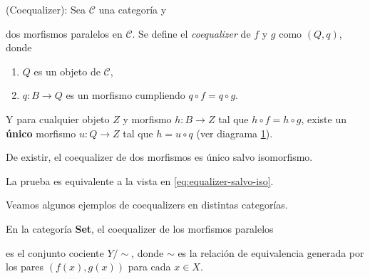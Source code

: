 \begin{definicion}
    (Coequalizer): Sea $\mathscr{C}$ una categoría y  dos morfismos paralelos en $\mathscr{C}$. Se define el \textit{coequalizer} de $f$ y $g$ como $(Q, q)$, donde
    \begin{enumerate}
        \item $Q$ es un objeto de $\mathscr{C}$,
        \item $q: B \longrightarrow Q$ es un morfismo cumpliendo $q \circ f = q \circ g$.
    \end{enumerate}
    Y para cualquier objeto $Z$ y morfismo $h: B \longrightarrow Z$ tal que $h \circ f = h \circ g$, existe un \textbf{único} morfismo $u: Q \longrightarrow Z$ tal que $h = u \circ q$ (ver diagrama \ref{diagrama:coequalizer}).

    \begin{figure}[h!]
        \centering
        \label{diagrama:coequalizer}
    \end{figure}

\end{definicion}

\begin{proposicion} \label{coeq:coequalizer}
    De existir, el coequalizer de dos morfismos es único salvo isomorfismo.
\end{proposicion}

La prueba es equivalente a la vista en \ref{eq:equalizer-salvo-iso}.

Veamos algunos ejemplos de coequalizers en distintas categorías.

\begin{ejemplo}
    En la categoría \textbf{Set}, el coequalizer de los morfismos paralelos 
    es el conjunto cociente $Y / \sim$, donde $\sim$ es la relación de equivalencia generada por los pares $(f(x), g(x))$ para cada $x \in X$.
\end{ejemplo}

